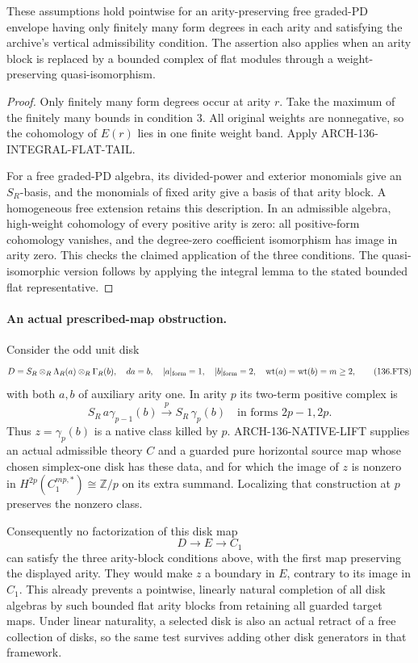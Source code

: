These assumptions hold pointwise for an arity-preserving free
graded-PD envelope having only finitely many form degrees in each
arity and satisfying the archive's vertical admissibility condition.
The assertion also applies when an arity block is replaced by a
bounded complex of flat modules through a weight-preserving
quasi-isomorphism.

\begin{proof}
Only finitely many form degrees occur at arity \(r\).
Take the maximum of the finitely many bounds in condition 3.
All original weights are nonnegative, so the cohomology of
\(E(r)\) lies in one finite weight band. Apply
ARCH-136-INTEGRAL-FLAT-TAIL.

For a free graded-PD algebra, its divided-power and exterior monomials
give an \(S_R\)-basis, and the monomials of fixed arity give a basis
of that arity block. A homogeneous free extension retains this
description. In an admissible algebra, high-weight cohomology of
every positive arity is zero: all positive-form cohomology vanishes,
and the degree-zero coefficient isomorphism has image in arity zero.
This checks the claimed application of the three conditions.
The quasi-isomorphic version follows by applying the integral lemma
to the stated bounded flat representative.
\end{proof}

\paragraph{An actual prescribed-map obstruction.}
Consider the odd unit disk
\[
 D=S_R\otimes_R\Lambda_R(a)\otimes_R\Gamma_R(b),
 \quad da=b,\quad |a|_{\rm form}=1,\quad |b|_{\rm form}=2,
 \quad\operatorname{wt}(a)=\operatorname{wt}(b)=m\geq2,
                                                        \tag{136.FT8}
\]
with both \(a,b\) of auxiliary arity one. In arity \(p\) its
two-term positive complex is
\[
 S_R\,a\gamma_{p-1}(b)
       \xrightarrow{\ p\ }S_R\,\gamma_p(b)
 \quad\text{in forms }2p-1,2p.
                                                        \tag{136.FT9}
\]
Thus \(z=\gamma_p(b)\) is a native class killed by \(p\).
ARCH-136-NATIVE-LIFT supplies an actual admissible theory \(C\)
and a guarded pure horizontal source map whose chosen simplex-one
disk has these data, and for which the image of \(z\) is nonzero
in \(H^{2p}(C_1^{mp,*})\cong\mathbb Z/p\) on its extra summand.
Localizing that construction at \(p\) preserves the nonzero class.

Consequently no factorization of this disk map
\[
                        D\longrightarrow E\longrightarrow C_1
                                                        \tag{136.FT10}
\]
can satisfy the three arity-block conditions above, with the first
map preserving the displayed arity. They would make \(z\) a boundary
in \(E\), contrary to its image in \(C_1\).
This already prevents a pointwise, linearly natural completion of
all disk algebras by such bounded flat arity blocks from retaining
all guarded target maps. Under linear naturality, a selected disk
is also an actual retract of a free collection of disks, so the
same test survives adding other disk generators in that framework.

